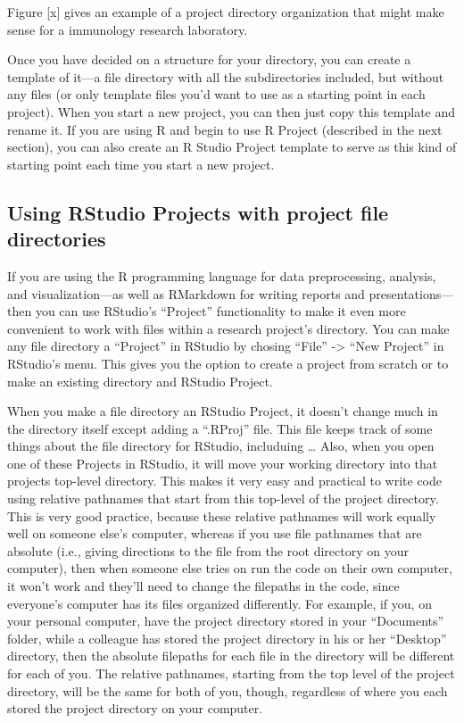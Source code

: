 \documentclass[]{tufte-book}
\begin{document}
Figure {[}x{]} gives an example of a project directory organization that might make
sense for a immunology research laboratory.

Once you have decided on a structure for your directory, you can create a
template of it---a file directory with all the subdirectories included, but
without any files (or only template files you'd want to use as a starting
point in each project). When you start a new project, you can then just
copy this template and rename it. If you are using R and begin to use
R Project (described in the next section), you can also create an R Studio
Project template to serve as this kind of starting point each time you
start a new project.

\hypertarget{using-rstudio-projects-with-project-file-directories}{%
\subsection{Using RStudio Projects with project file directories}\label{using-rstudio-projects-with-project-file-directories}}

If you are using the R programming language for data preprocessing, analysis,
and visualization---as well as RMarkdown for writing reports and
presentations---then you can use RStudio's ``Project'' functionality to make it
even more convenient to work with files within a research project's directory.
You can make any file directory a ``Project'' in RStudio by chosing ``File'' -\textgreater{}
``New Project'' in RStudio's menu. This gives you the option to create a
project from scratch or to make an existing directory and RStudio Project.

When you make a file directory an RStudio Project, it doesn't change much in
the directory itself except adding a ``.RProj'' file. This file keeps track of
some things about the file directory for RStudio, includuing \ldots{} Also, when you
open one of these Projects in RStudio, it will move your working directory
into that projects top-level directory. This makes it very easy and practical
to write code using relative pathnames that start from this top-level of the
project directory. This is very good practice, because these relative pathnames
will work equally well on someone else's computer, whereas if you use file
pathnames that are absolute (i.e., giving directions to the file from the root
directory on your computer), then when someone else tries on run the code on their
own computer, it won't work and they'll need to change the filepaths in the code,
since everyone's computer has its files organized differently. For example, if you,
on your personal computer, have the project directory stored in your ``Documents''
folder, while a colleague has stored the project directory in his or her ``Desktop''
directory, then the absolute filepaths for each file in the directory will be
different for each of you. The relative pathnames, starting from the top level of
the project directory, will be the same for both of you, though, regardless of
where you each stored the project directory on your computer.
\end{document}
